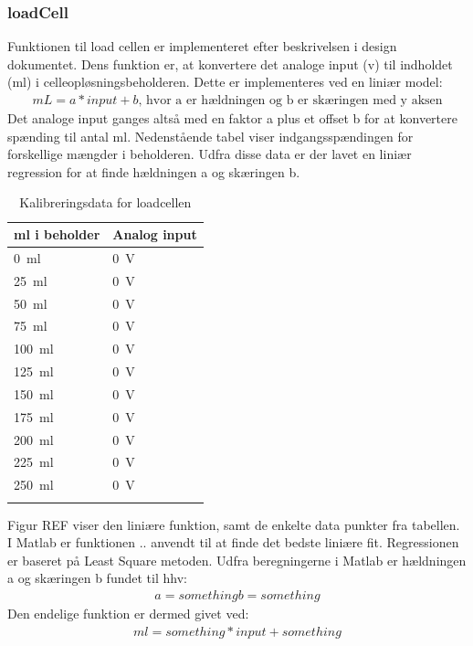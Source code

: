 \subsubsection{loadCell} 
Funktionen til load cellen er implementeret efter beskrivelsen i design dokumentet. Dens funktion er, at konvertere det analoge input (v) til indholdet (ml) i celleopløsningsbeholderen. Dette er implementeres ved en liniær model:
\begin{align}
mL = a*input+b \text{, hvor a er hældningen og b er skæringen med y aksen}
\end{align}
Det analoge input ganges altså med en faktor a plus et offset b for at konvertere spænding til antal ml. Nedenstående tabel viser indgangsspændingen for forskellige mængder i beholderen. Udfra disse data er der lavet en liniær regression for at finde hældningen a og skæringen b.
\begin{center}
		\begin{longtable}{ | m{3cm} | m{3cm}| } 
			\hline
			\textbf{ml i beholder} &\textbf{Analog input} \\ 
			\hline
			 \SI{0}{\milli\litre} & \SI{0}{\volt} \\ 
			\hline
			 \SI{25}{\milli\litre} & \SI{0}{\volt} \\ 
			\hline
			\SI{50}{\milli\litre} & \SI{0}{\volt} \\ 
			\hline
			\SI{75}{\milli\litre} & \SI{0}{\volt} \\ 
			\hline
			\SI{100}{\milli\litre} & \SI{0}{\volt} \\ 
			\hline
			\SI{125}{\milli\litre} & \SI{0}{\volt} \\ 
			\hline
			\SI{150}{\milli\litre} & \SI{0}{\volt} \\ 
			\hline
			\SI{175}{\milli\litre} & \SI{0}{\volt} \\ 
			\hline
			\SI{200}{\milli\litre} & \SI{0}{\volt} \\ 
			\hline
			\SI{225}{\milli\litre} & \SI{0}{\volt} \\ 
			\hline
			\SI{250}{\milli\litre} & \SI{0}{\volt} \\ 
			\hline
			\caption{Kalibreringsdata for loadcellen}
			 		\end{longtable}
\end{center}

Figur REF viser den liniære funktion, samt de enkelte data punkter fra tabellen. I Matlab er funktionen .. anvendt til at finde det bedste liniære fit. Regressionen er baseret på Least Square metoden. 
Udfra beregningerne i Matlab er hældningen a og skæringen b fundet til hhv:
\begin{align}
a = something
b = something
\end{align}
Den endelige funktion er dermed givet ved:
\begin{align}
ml = something*input+something
\end{align}

